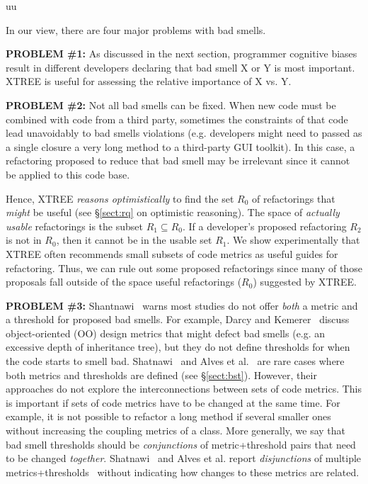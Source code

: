 uu \documentclass[final,twocolumn,5p]{elsarticle}
\newcommand{\tion}[1]{\S\ref{sect:#1}}
\theoremstyle{break}
\begin{document}
In our view, there are four major problems with bad smells.

{\bf PROBLEM \#1:} As discussed in the next section, programmer
  cognitive biases result in different
developers declaring that
bad smell X or Y is most important. 
 XTREE is useful for  assessing the relative importance of
   X vs. Y.
  

{\bf PROBLEM \#2:} Not all bad smells can be fixed. 
When new code must
be combined with code from a third party, 
sometimes the constraints of that code 
lead unavoidably to bad smells violations (e.g.
developers might need to passed as a single closure a  very long method
to  a third-party GUI toolkit).   In this case,
a refactoring proposed to reduce that bad smell
may be irrelevant since it cannot be applied to this code base.

Hence, XTREE {\em reasons optimistically} to find the set
$R_0$ of refactorings that \textit{might} be useful (see \tion{rq} on optimistic reasoning).
The space of \textit{actually usable} refactorings is 
the subset $R_1 \subseteq R_0$.
If a developer's proposed refactoring $R_2$ is
not in $R_0$, then it cannot be in the usable
set $R_1$.  We show experimentally that XTREE
often recommends small subsets of
code metrics as useful guides for refactoring. Thus, we
can rule out some proposed refactorings
since many of those proposals fall outside of the space
useful refactorings ($R_0$) suggested by XTREE.  



{\bf PROBLEM \#3:}  
Shantnawi~\cite{Shatnawi10} warns most  studies do not offer
{\em both} a metric and a threshold for proposed bad smells. For example,  Darcy and Kemerer~\cite{darcy05}
discuss object-oriented (OO) design metrics that might defect bad smells (e.g. an excessive
depth of inheritance tree), but they do not define thresholds
for when the code starts to smell bad.  
Shatnawi~\cite{Shatnawi10}
and  Alves et al.~\cite{Alves2010} are rare cases where both metrics and thresholds are defined (see \tion{bst}).
However, their approaches do not explore the interconnections between sets of code metrics. This is important if sets of
code metrics have to be changed at the same time.
For example, it is not possible to refactor a
long method if several smaller ones without increasing
the coupling metrics of a class. 
More generally, we say that bad smell thresholds should be
{\em conjunctions} of metric+threshold pairs that need to be changed {\em together}.
Shatnawi~\cite{Shatnawi10}
and Alves et al. report {\em disjunctions} of multiple metrics+thresholds~\cite{Shatnawi10,Alves2010} without indicating how changes to these metrics are related.
\end{document}
